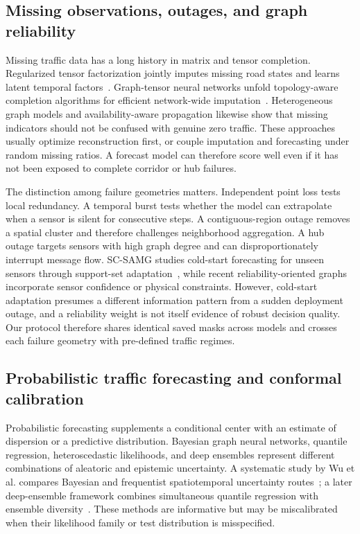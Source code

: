 \documentclass[preprint,12pt]{elsarticle}
\begin{document}
\subsection{Missing observations, outages, and graph reliability}
Missing traffic data has a long history in matrix and tensor completion.
Regularized tensor factorization jointly imputes missing road states and learns
latent temporal factors~\cite{baggag2021tensor}. Graph-tensor neural networks
unfold topology-aware completion algorithms for efficient network-wide
imputation~\cite{xu2023graphtensor}. Heterogeneous graph models and
availability-aware propagation likewise show that missing indicators should not
be confused with genuine zero traffic. These approaches usually optimize
reconstruction first, or couple imputation and forecasting under random missing
ratios. A forecast model can therefore score well even if it has not been
exposed to complete corridor or hub failures.

The distinction among failure geometries matters. Independent point loss tests
local redundancy. A temporal burst tests whether the model can extrapolate when
a sensor is silent for consecutive steps. A contiguous-region outage removes a
spatial cluster and therefore challenges neighborhood aggregation. A hub outage
targets sensors with high graph degree and can disproportionately interrupt
message flow. SC-SAMG studies cold-start forecasting for unseen sensors through
support-set adaptation~\cite{wang2026scsamg}, while recent reliability-oriented
graphs incorporate sensor confidence or physical constraints. However,
cold-start adaptation presumes a different information pattern from a sudden
deployment outage, and a reliability weight is not itself evidence of robust
decision quality. Our protocol therefore shares identical saved masks across
models and crosses each failure geometry with pre-defined traffic regimes.

\subsection{Probabilistic traffic forecasting and conformal calibration}
Probabilistic forecasting supplements a conditional center with an estimate of
dispersion or a predictive distribution. Bayesian graph neural networks,
quantile regression, heteroscedastic likelihoods, and deep ensembles represent
different combinations of aleatoric and epistemic uncertainty. A systematic
study by Wu et al. compares Bayesian and frequentist spatiotemporal uncertainty
routes~\cite{wu2021uq}; a later deep-ensemble framework combines simultaneous
quantile regression with ensemble diversity~\cite{liu2024ensembleuq}. These
methods are informative but may be miscalibrated when their likelihood family
or test distribution is misspecified.
\end{document}
